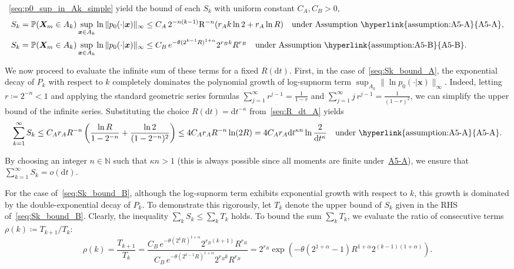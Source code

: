 ~\eqref{seq:p0_sup_in_Ak_simple} yield the bound of each $S_k$ with uniform constant $C_A,C_B>0$,
\begin{subequations}\label{seq:Sk_bound}
\renewcommand{\theequation}{\theparentequation-\Alph{equation}}
\begin{align}
    S_k=\mathbb P(\bm X_m\in A_k)\sup_{\bm x\in A_k}\ln\|p_0(\cdot|\bm x)\|_\infty
    &\leq
    C_A\,2^{-n(k-1)}\mathrm R^{-n}
    (r_Ak\ln2+r_A\ln R)
    \quad\text{under Assumption~\hyperlink{assumption:A5-A}{A5-A}}
    \label{seq:Sk_bound_A},
    \\
    S_k=\mathbb P(\bm X_m\in A_k)\sup_{\bm x\in A_k}\ln\|p_0(\cdot|\bm x)\|_\infty
    &\leq
    C_B\,e^{-\theta (2^{k-1}R)^{1+\alpha}}
    2^{r_Bk}R^{r_B}
    \quad\text{under Assumption~\hyperlink{assumption:A5-B}{A5-B}}.
  \label{seq:Sk_bound_B}
\end{align}
\end{subequations}

We now proceed to evaluate the infinite sum of these terms for a fixed $R(\mathrm dt)$. First, in the case of~\eqref{seq:Sk_bound_A}, the exponential decay of $P_k$ with respect to $k$ completely dominates the polynomial growth of log-supnorm term $\sup_{A_k}\|\ln p_0(\cdot|\bm x)\|_\infty$.
Indeed, letting $r\coloneq2^{-n}<1$ and applying the standard geometric series formulas $\sum_{j=1}^\infty r^{j-1}=\frac{1}{1-r}$ and $\sum_{j=1}^\infty j\,r^{j-1}=\frac{1}{(1-r)^2}$,
we can simplify the upper bound of the infinite series. Substituting the choice $R(\mathrm dt)=\mathrm dt^{-\kappa}$ from~\eqref{seq:R_dt_A} yields
\begin{equation}
    \sum_{k=1}^\infty S_k
    \leq
    C_Ar_A R^{-n}\left(
    \frac{\ln R}{1-2^{-n}}
    +\frac{\ln 2}{(1-2^{-n})^2}\right)
    \leq
    4C_Ar_AR^{-n}\ln(2R)
    =4C_Ar_A\mathrm dt^{\kappa n}
    \ln\frac{2}{\mathrm dt^\kappa}
    \quad\text{under~\hyperlink{assumption:A5-A}{A5-A}}.
    \label{seq:sum_Sk_bound_A}
\end{equation}

By choosing an integer $n\in\mathbb N$ such that $\kappa n>1$ (this is always possible since all moments are finite under~\hyperlink{assumption:A5-A}{A5-A}), we ensure that $\sum_{k=1}^\infty S_k=o(\mathrm dt)$.

For the case of~\eqref{seq:Sk_bound_B}, although the log-supnorm term exhibits exponential growth with respect to $k$, this growth is dominated by the double-exponential decay of $P_k$. To demonstrate this rigorously, let $T_k$ denote the upper bound of $S_k$ given in the RHS of~\eqref{seq:Sk_bound_B}. Clearly, the inequality $\sum_k S_k\leq\sum_k T_k$ holds. To bound the sum $\sum_k T_k$, we evaluate the ratio of consecutive terms $\rho(k)\coloneq T_{k+1}/T_k$:
\begin{equation}
    \rho(k)=
    \frac{T_{k+1}}{T_k}
    =\frac{C_B\,e^{-\theta (2^{k}R)^{1+\alpha}}
    2^{r_B(k+1)}R^{r_B}}
    {C_B\,e^{-\theta (2^{k-1}R)^{1+\alpha}}
    2^{r_Bk}R^{r_B}}
    =2^{r_B}\exp\!\left(
    -\theta(2^{1+\alpha}-1)R^{1+\alpha}2^{(k-1)(1+\alpha)}
    \right).
    \label{seq:rho_k}
\end{equation}

